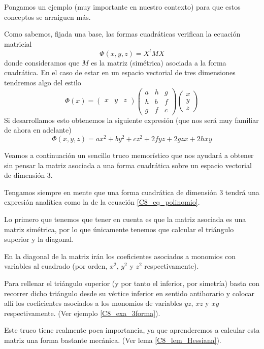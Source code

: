 Pongamos un ejemplo (muy importante en nuestro contexto) para que estos conceptos se arraiguen más.
\begin{exa}
	\label{C8_exa_3forma}
	Como sabemos, fijada una base, las formas cuadráticas verifican la ecuación matricial
	\[\Phi(x,y,z)=X^tMX\]
	donde consideramos que $M$ es la matriz (simétrica) asociada a la forma cuadrática. En el caso de estar en un espacio vectorial de tres dimensiones tendremos algo del estilo
	\[\Phi(x)=\begin{pmatrix}
	x & y & z
	\end{pmatrix}\begin{pmatrix}
	a & h & g\\
	h & b & f\\
	g & f & c
	\end{pmatrix}\begin{pmatrix}
	x\\
	y\\
	z
	\end{pmatrix}\]
	Si desarrollamos esto obtenemos la siguiente expresión (que nos será muy familiar de ahora en adelante)
	\begin{equation}
	\label{C8_eq_polinomio}
	\Phi(x,y,z)=ax^2+by^2+cz^2+2fyz+2gzx+2hxy\end{equation}
\end{exa}
Veamos a continuación un sencillo truco memorístico que nos ayudará a obtener sin pensar la matriz asociada a una forma cuadrática sobre un espacio vectorial de dimensión $3$. 
\begin{obs}
	Tengamos siempre en mente que una forma cuadrática de dimensión $3$ tendrá una expresión analítica como la de la ecuación \eqref{C8_eq_polinomio}.
	
	Lo primero que tenemos que tener en cuenta es que la matriz asociada es una matriz simétrica, por lo que únicamente tenemos que calcular el triángulo superior y la diagonal.
	
	En la diagonal de la matriz irán los coeficientes asociados a monomios con variables al cuadrado (por orden, $x^2$, $y^2$ y $z^2$ respectivamente).
	
	Para rellenar el triángulo superior (y por tanto el inferior, por simetría) basta con recorrer dicho triángulo desde su vértice inferior en sentido antihorario y colocar allí los coeficientes asociados a los monomios de variables $yz$, $xz$ y $xy$ respectivamente. (Ver ejemplo \ref{C8_exa_3forma}).
	
	Este truco tiene realmente poca importancia, ya que aprenderemos a calcular esta matriz una forma bastante mecánica. (Ver lema \ref{C8_lem_Hessiana}).
\end{obs}
